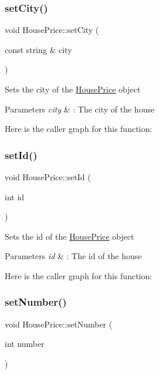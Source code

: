 \subsubsection{\texorpdfstring{set\+City()}{setCity()}}
{\footnotesize\ttfamily void House\+Price\+::set\+City (\begin{DoxyParamCaption}\item[{const string \&}]{city }\end{DoxyParamCaption})}

Sets the city of the \hyperlink{class_house_price}{House\+Price} object 
\begin{DoxyParams}{Parameters}
{\em city} & \+: The city of the house \\
\hline
\end{DoxyParams}
Here is the caller graph for this function\+:
\mbox{\label{class_house_price_a43fead2f6a533d6f1f59c36e5f4e6c83}} 
\subsubsection{\texorpdfstring{set\+Id()}{setId()}}
{\footnotesize\ttfamily void House\+Price\+::set\+Id (\begin{DoxyParamCaption}\item[{int}]{id }\end{DoxyParamCaption})}

Sets the id of the \hyperlink{class_house_price}{House\+Price} object 
\begin{DoxyParams}{Parameters}
{\em id} & \+: The id of the house \\
\hline
\end{DoxyParams}
Here is the caller graph for this function\+:
\mbox{\label{class_house_price_ab5de6255cccde277c23b9b33efb6b825}} 
\subsubsection{\texorpdfstring{set\+Number()}{setNumber()}}
{\footnotesize\ttfamily void House\+Price\+::set\+Number (\begin{DoxyParamCaption}\item[{int}]{number }\end{DoxyParamCaption})}

